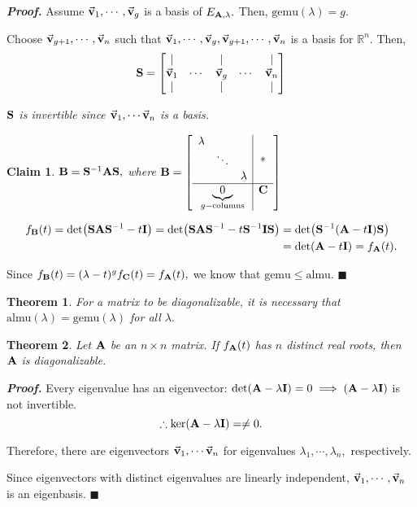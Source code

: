 \documentclass[12pt, a4paper]{article}
\newtheorem{thm}{Theorem}[subsection]
\newtheorem{clm}{\indent Claim}[section]
\newenvironment*{prf}{\par\indent\textbf{\textit{Proof. }}}{\hfill $\blacksquare$\par}
\def\R{{\mathbb{R}}}
\def\almu{\mathrm{almu}}
\def\gemu{\mathrm{gemu}}
\def\vecv{\va{v}}
\def\matrixA{\vb{A}}
\def\matrixB{\vb{B}}
\def\matrixC{\vb{C}}
\def\matrixI{\vb{I}}
\def\matrixS{\vb{S}}
\begin{document}
\begin{prf}
	Assume $\vecv_1,\cdots,\vecv_g$ is a basis of $E_{\matrixA,\lambda}.$ Then, $\gemu(\lambda)=g.$\par Choose $\vecv_{g+1},\cdots,\vecv_n$ such that $\vecv_1,\cdots,\vecv_g,\vecv_{g+1},\cdots,\vecv_n$ is a basis for $\R^n.$ Then, \[\matrixS=\mqty[|&&|&&|\\\vecv_1&\cdots&\vecv_g&\cdots&\vecv_n\\|&&|&&|]\]\par \textit{$\matrixS$ is invertible since $\vecv_1,\cdots\vecv_n$ is a basis.}\par \begin{clm}$\matrixB=\matrixS^{-1}\matrixA\matrixS,$ where $\matrixB=\left[\begin{array}{c|c}\mqty{\lambda&&\\&\ddots&\\&&\lambda}&*\\\hline\underbrace{0}_{g-\text{columns}}&\matrixC\end{array}\right]$\end{clm}\[\begin{aligned}f_{\matrixB}(t)=\det(\matrixS\matrixA\matrixS^{-1}-t\matrixI)=\det(\matrixS\matrixA\matrixS^{-1}-t\matrixS^{-1}\matrixI\matrixS)&=\det(\matrixS^{-1}(\matrixA-t\matrixI)\matrixS)\\&=\det(\matrixA-t\matrixI)=f_{\matrixA}(t).\end{aligned}\]\par Since $f_{\matrixB}(t)=(\lambda-t)^gf_{\matrixC}(t)=f_{\matrixA}(t),$ we know that $\gemu\leq\almu.$
\end{prf}
\begin{thm}
	For a matrix to be diagonalizable, it is necessary that $\almu(\lambda)=\gemu(\lambda)$ for all $\lambda.$
\end{thm}
\begin{thm}
	Let $\matrixA$ be an $n\times n$ matrix. If $f_{\matrixA}(t)$ has $n$ distinct real roots, then $\matrixA$ is diagonalizable.
\end{thm}
\begin{prf}
	Every eigenvalue has an eigenvector: $\det(\matrixA-\lambda\matrixI)=0\implies(\matrixA-\lambda\matrixI)$ is not invertible. \[\therefore\ker(\matrixA-\lambda\matrixI)=\neq0.\]\par Therefore, there are eigenvectors $\vecv_1,\cdots\vecv_n$ for eigenvalues $\lambda_1,\cdots,\lambda_n,$ respectively.\par Since eigenvectors with distinct eigenvalues are linearly independent, $\vecv_1,\cdots,\vecv_n$ is an eigenbasis. 
\end{prf}
\end{document}
